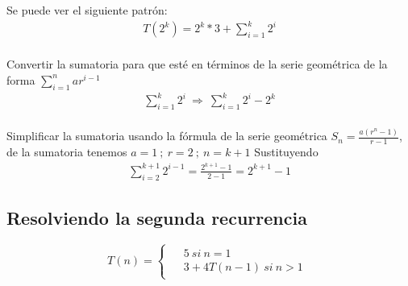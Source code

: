 \documentclass[11pt,letterpaper,fleqn]{article}
\begin{document}
Se puede ver el siguiente patrón:
\begin{equation*}
	\begin{aligned}
		T(2^{k}) = 2^{k}*3 + \sum_{i=1}^{k} 2^{i} \\
	\end{aligned}
\end{equation*}

Convertir la sumatoria para que esté en términos de la serie geométrica de la forma $\displaystyle \sum_{i=1}^{n}ar^{i-1}$
\begin{equation*}
	\begin{aligned}
		\sum_{i=1}^{k}2^{i} \ \Rightarrow \ \sum_{i=1}^{k}2^{i} -2^{k} \\
	\end{aligned}
\end{equation*}

Simplificar la sumatoria usando la fórmula de la serie geométrica $S_{n} = \frac{a(r^{n}-1)}{r-1}$, de la sumatoria tenemos $a = 1 \ ; \ r=2 \ ; \ n =k+1$ \smallbreak
Sustituyendo
\begin{equation*}
	\begin{aligned}
		\sum_{i=2}^{k+1}2^{i-1} = \frac{2^{k+1}-1}{2-1} = 2^{k+1}-1
	\end{aligned}
\end{equation*}

\newpage
\subsection{Resolviendo la segunda recurrencia}
\begin{equation*}
	T(n) =
	\begin{cases}
		\begin{aligned}
			&5 \ si \ n = 1\\
			&3 + 4T(n-1) \ si \ n > 1
		\end{aligned}
	\end{cases}
\end{equation*}
\end{document}

